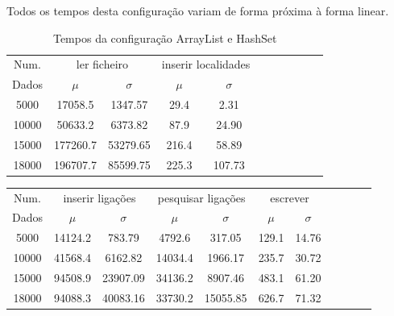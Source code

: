 \documentclass[a5paper,twocolumn, 11pt]{article}
\begin{document}
Todos os tempos desta configuração variam de forma próxima à forma linear.
\clearpage
\onecolumn
\begin{center}
    \begin{table}[h!b!t!]
    \begin{center}
    \caption{Tempos da configuração ArrayList e HashSet}
\begin{tabular}{ | *{11}{c|} }
\hline
    Num. & \multicolumn{2}{|c|}{ler ficheiro} & \multicolumn{2}{|c|}{inserir localidades}\\ %
    
    Dados & $\mu$ & $\sigma$ & $\mu$ & $\sigma$\\ \hline
    5000 & 17058.5 & 1347.57 & 29.4 & 2.31\\ \hline
    10000 & 50633.2 & 6373.82 & 87.9 & 24.90\\ \hline
    15000 & 177260.7 & 53279.65 & 216.4 & 58.89\\ \hline
    18000 & 196707.7 & 85599.75 & 225.3 & 107.73\\ \hline
\end{tabular}
\end{center}
\end{table}
\begin{tabular}{ | *{11}{c|} }
\hline
    Num. & \multicolumn{2}{|c|}{inserir ligações} & \multicolumn{2}{|c|}{pesquisar ligações} & \multicolumn{2}{|c|}{escrever}\\ %
    
    Dados & $\mu$ & $\sigma$ & $\mu$ & $\sigma$ & $\mu$ & $\sigma$\\ \hline
    5000 & 14124.2 & 783.79 & 4792.6 & 317.05 & 129.1 & 14.76\\ \hline
    10000 & 41568.4 & 6162.82 & 14034.4 & 1966.17 & 235.7 & 30.72\\ \hline
    15000 & 94508.9 & 23907.09 & 34136.2 & 8907.46 & 483.1 & 61.20\\ \hline
    18000 & 94088.3 & 40083.16 & 33730.2 & 15055.85 & 626.7 & 71.32\\ \hline
\end{tabular}
\end{center}
\end{document}

